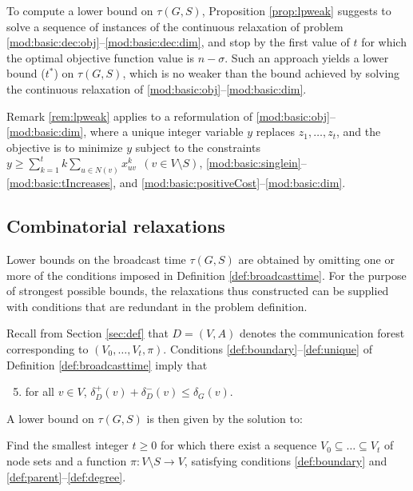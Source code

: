 \begin{remark} \label{rem:lpweak}
To compute a lower bound on $\tau(G,S)$, Proposition \ref{prop:lpweak} suggests to solve a sequence of instances of the continuous relaxation of problem \eqref{mod:basic:dec:obj}--\eqref{mod:basic:dec:dim},
and stop by the first value of $t$ for which the optimal objective function value is $n-\sigma$.
Such an approach yields a lower bound ($t^{\ast}$) on $\tau(G,S)$,
which is no weaker than the bound achieved by solving the continuous relaxation of \eqref{mod:basic:obj}--\eqref{mod:basic:dim}.
\end{remark}

\begin{remark} \label{rem:otheropt}
Remark \ref{rem:lpweak} applies to a reformulation of \eqref{mod:basic:obj}--\eqref{mod:basic:dim}, where a unique integer variable $y$ replaces $z_1,\ldots,z_t$,
and the objective is to minimize $y$ subject to the constraints
$y\geq\sum\limits_{k=1}^tk\sum\limits_{u \in N(v)}x_{uv}^k ~~(v\in V\setminus S)$, \eqref{mod:basic:singlein}--\eqref{mod:basic:tIncreases},
and \eqref{mod:basic:positiveCost}--\eqref{mod:basic:dim}.
\end{remark}

\subsection{Combinatorial relaxations} \label{sec:lbcombrel}

Lower bounds on the broadcast time $\tau(G,S)$ are obtained by omitting one or more of the conditions imposed in Definition \ref{def:broadcasttime}.
For the purpose of strongest possible bounds, the relaxations thus constructed can be supplied with conditions that are redundant in the problem definition.

Recall from Section \ref{sec:def} that $D=(V,A)$ denotes the communication forest corresponding to $\left(V_0,\ldots,V_t,\pi\right)$.
Conditions \ref{def:boundary}--\ref{def:unique} of Definition \ref{def:broadcasttime} imply that
\begin{enumerate}
\setcounter{enumi}{4}
  \item for all $v\in V$, $\delta_D^+(v)+\delta_D^-(v)\leq\delta_G(v)$. \label{def:degree}
\end{enumerate}

\noindent
A lower bound on $\tau(G,S)$ is then given by the solution to:
\begin{problem}\label{prob:degree}
Find the smallest integer $t\geq 0$ for which there exist
a sequence $V_0\subseteq\dots\subseteq V_t$ of node sets and a function $\pi:V\setminus S\to V$,
satisfying conditions \ref{def:boundary} and \ref{def:parent}--\ref{def:degree}.
\end{problem}

